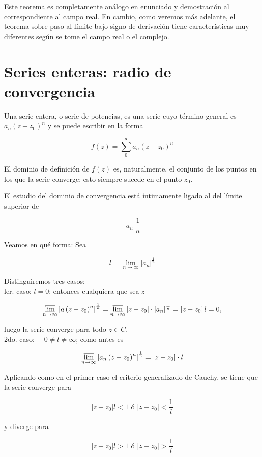 \documentclass[10pt]{article}
\theoremstyle{plain}
\theoremstyle{definition}
\theoremstyle{remark}
\begin{document}
Este teorema es completamente análogo en enunciado y demostración al correspondiente al campo real. En cambio, como veremos más adelante, el teorema sobre paso al límite bajo signo de derivación tiene características muy diferentes según se tome el campo real o el complejo.

\section{Series enteras: radio de convergencia}
Una serie entera, o serie de potencias, es una serie cuyo término general es $a_{n}\left(z-z_{0}\right)^{n}$ y se puede escribir en la forma


\begin{equation*}
f(z)=\sum_{0}^{\infty} a_{n}\left(z-z_{0}\right)^{n} \tag{9-1}
\end{equation*}


El dominio de definición de $f(z)$ es, naturalmente, el conjunto de los puntos en los que la serie converge; esto siempre sucede en el punto $z_{0}$.

El estudio del dominio de convergencia está íntimamente ligado al del límite superior de

$$
\left|a_{n}\right| \frac{1}{n}
$$

Veamos en qué forma: Sea

$$
l=\lim _{n \rightarrow \infty}\left|a_{n}\right|^{\frac{1}{n}}
$$

Distinguiremos tres casos:\\
ler. caso: $l=0$; entonces cualquiera que sea $z$

$$
\varlimsup_{n \rightarrow \infty}\left|a\left(z-z_{0}\right)^{n}\right|^{\frac{1}{n}}=\varlimsup_{n \rightarrow \infty}\left|z-z_{0}\right| \cdot\left|a_{n}\right|^{\frac{1}{n}}=\left|z-z_{0}\right| l=0,
$$

luego la serie converge para todo $z \in C$.\\
2do. caso: $\quad 0 \neq l \neq \infty$; como antes es

$$
\varlimsup_{n \rightarrow \infty}\left|a_{n}\left(z-z_{0}\right)^{n}\right|^{\frac{1}{n}}=\left|z-z_{0}\right| \cdot l
$$

Aplicando como en el primer caso el criterio generalizado de Cauchy, se tiene que la serie converge para

$$
\left|z-z_{0}\right| l<1 \text { ó }\left|z-z_{0}\right|<\frac{1}{l}
$$

y diverge para

$$
\left|z-z_{0}\right| l>1 \text { ó }\left|z-z_{0}\right|>\frac{1}{l}
$$
\end{document}
